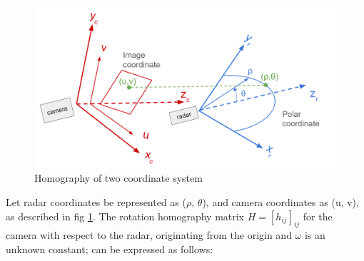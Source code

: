 \begin{figure}[hpbt]
    \centering
    \includegraphics[width=12cm]{Figures/homography.png}%
    \caption{Homography of two coordinate system}
    \label{fig:homography_figure}
\end{figure}
Let radar coordinates be represented as ($\rho$, $\theta$), 
and camera coordinates as (u, v), as described in fig \ref{fig:homography_figure}. 
The rotation homography matrix $H=[h_{ij}]_{ij}$ for the camera with respect to the radar, 
originating from the origin and $\omega$ is an unknown constant; can be expressed as follows:

